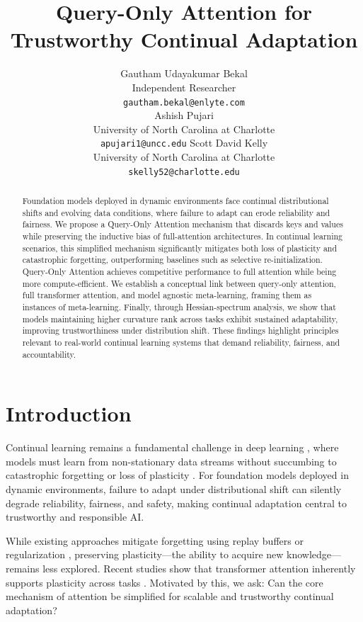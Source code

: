 \documentclass{article}
\title{Query-Only Attention for Trustworthy Continual Adaptation}
\author{
  Gautham Udayakumar Bekal \\
  Independent Researcher \\
  \texttt{gautham.bekal@enlyte.com} \\
  \And
  Ashish Pujari \\
  University of North Carolina at Charlotte \\
  \texttt{apujari1@uncc.edu}
  \And
  Scott David Kelly \\
  University of North Carolina at Charlotte \\
  \texttt{skelly52@charlotte.edu}
}
\begin{document}
\maketitle

\begin{abstract}

Foundation models deployed in dynamic environments face continual distributional shifts and evolving data conditions, where failure to adapt can erode reliability and fairness. We propose a Query-Only Attention mechanism that discards keys and values while preserving the inductive bias of full-attention architectures. 
In continual learning scenarios, this simplified mechanism significantly mitigates both loss of plasticity and catastrophic forgetting, outperforming baselines such as selective re-initialization. 
Query-Only Attention achieves competitive performance to full attention while being more compute-efficient.
We establish a conceptual link between query-only attention, full transformer attention, and model agnostic meta-learning, framing them as instances of meta-learning. 
Finally, through Hessian-spectrum analysis, we show that models maintaining higher curvature rank across tasks exhibit sustained adaptability, improving trustworthiness under distribution shift.
These findings highlight principles relevant to real-world continual learning systems that demand reliability, fairness, and accountability.
\end{abstract}

\section{Introduction}
Continual learning remains a fundamental challenge in deep learning \citep{wang2024comprehensive}, where models must learn from non-stationary data streams without succumbing to catastrophic forgetting \citep{kirkpatrick2017overcoming} or loss of plasticity \citep{dohare2024loss}.
For foundation models deployed in dynamic environments, failure to adapt under distributional shift can silently degrade reliability, fairness, and safety, making continual adaptation central to trustworthy and responsible AI.

While existing approaches mitigate forgetting using replay buffers \citep{zhang2024core} or regularization \citep{kirkpatrick2017overcoming}, preserving plasticity—the ability to acquire new knowledge—remains less explored.
Recent studies show that transformer attention \citep{vaswani2017attention} inherently supports plasticity across tasks \citep{wang2025replay}. Motivated by this, we ask: Can the core mechanism of attention be simplified for scalable and trustworthy continual adaptation?
\end{document}
